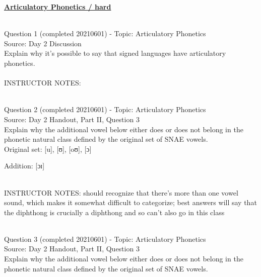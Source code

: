\documentclass[12pt]{article}
\begin{document}
\begin{center}
\textbf{{\color{violet}{\HUGE ALL QUESTIONS\\}}}

\textbf{{\color{violet}{\HUGE BY TOPIC\\}}}

\end{center}
\newpage

\textbf{\underline{\huge Articulatory Phonetics / hard\\}}

~\\

{\large Question 1} (completed 20210601) - Topic: Articulatory Phonetics\\
Source: Day 2 Discussion\\

Explain why it's possible to say that signed languages have articulatory phonetics.\\


~\\
INSTRUCTOR NOTES: 


~\\

{\large Question 2} (completed 20210601) - Topic: Articulatory Phonetics\\
Source: Day 2 Handout, Part II, Question 3\\

Explain why the additional vowel below either does or does not belong in the phonetic natural class defined by the original set of SNAE vowels.\\

Original set: {[u]}, {[ʊ]}, {[oʊ]}, {[ɔ]}

Addition: {[ɔɪ]}


~\\
INSTRUCTOR NOTES: should recognize that there's more than one vowel sound, which makes it somewhat difficult to categorize; best answers will say that the diphthong is crucially a diphthong and so can't also go in this class


~\\

{\large Question 3} (completed 20210601) - Topic: Articulatory Phonetics\\
Source: Day 2 Handout, Part II, Question 3\\

Explain why the additional vowel below either does or does not belong in the phonetic natural class defined by the original set of SNAE vowels.\\
\end{document}
